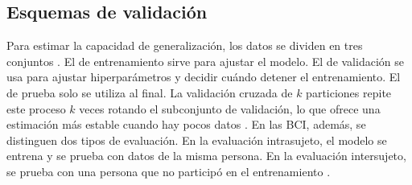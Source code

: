 \subsection{Esquemas de validación}

Para estimar la capacidad de generalización, los datos se dividen en tres conjuntos
\cite{goodfellow2016}. El de entrenamiento sirve para ajustar el modelo. El de validación se usa
para ajustar hiperparámetros y decidir cuándo detener el entrenamiento. El de prueba solo se
utiliza al final. La
validación cruzada de $k$ particiones repite este proceso $k$ veces rotando el subconjunto de
validación, lo que ofrece una estimación más estable cuando hay pocos datos \cite{bishop2006}. En
las BCI, además, se distinguen dos tipos de evaluación. En la evaluación intrasujeto, el modelo se
entrena y se prueba con datos de la misma persona. En la evaluación intersujeto, se prueba con una
persona que no participó en el entrenamiento \cite{alvarado2021}.
